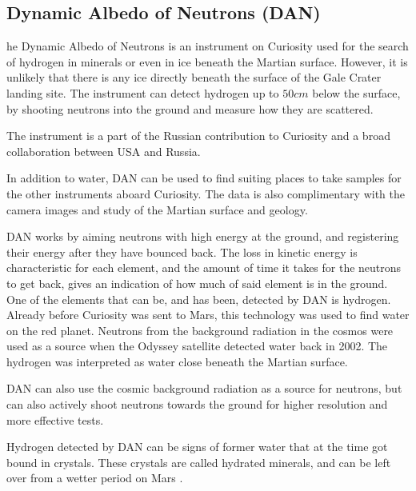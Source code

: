 \subsection{Dynamic Albedo of Neutrons (DAN)}
he Dynamic Albedo of Neutrons is an instrument on Curiosity used for the search of hydrogen in minerals or even in ice beneath the Martian surface.
However, it is unlikely that there is any ice directly beneath the surface of the Gale Crater landing site.
The instrument can detect hydrogen up to $50 cm$ below the surface, by shooting neutrons into the ground and measure how they are scattered.

The instrument is a part of the Russian contribution to Curiosity and a broad collaboration between USA and Russia.

In addition to water, DAN can be used to find suiting places to take samples for the other instruments aboard Curiosity.
The data is also complimentary with the camera images and study of the Martian surface and geology.

DAN works by aiming neutrons with high energy at the ground, and registering their energy after they have bounced back.
The loss in kinetic energy is characteristic for each element, and the amount of time it takes for the neutrons to get back, gives an indication of how much of said element is in the ground.
One of the elements that can be, and has been, detected by DAN is hydrogen.
Already before Curiosity was sent to Mars, this technology was used to find water on the red planet.
Neutrons from the background radiation in the cosmos were used as a source when the Odyssey satellite detected water back in 2002.
The hydrogen was interpreted as water close beneath the Martian surface.

DAN can also use the cosmic background radiation as a source for neutrons, but can also actively shoot neutrons towards the ground for higher resolution and more effective tests.

Hydrogen detected by DAN can be signs of former water that at the time got bound in crystals.
These crystals are called hydrated minerals, and can be left over from a wetter period on Mars \cite{NASA-rover}.